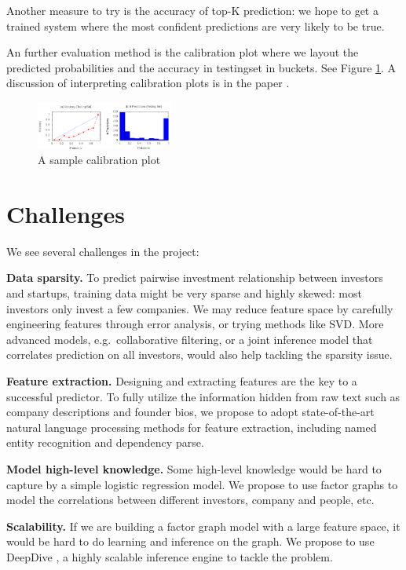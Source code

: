 Another measure to try is the accuracy of top-K prediction: we hope to
get a trained system where the most confident predictions are very
likely to be true.

An further evaluation method is the calibration plot where we layout the
predicted probabilities and the accuracy in testingset in buckets. See
Figure \ref{fig:calibration}. A discussion of interpreting calibration
plots is in the paper \cite{zhang2014feature}.

\begin{figure}[ht!]
\centering
\includegraphics[width=0.4\textwidth]{img/calibration.png}
\caption{A sample calibration plot}
\label{fig:calibration}
\end{figure}

\section{Challenges}\label{challenges}

We see several challenges in the project:

\textbf{Data sparsity.} To predict pairwise investment relationship
between investors and startups, training data might be very sparse and
highly skewed: most investors only invest a few companies. We may reduce
feature space by carefully engineering features through error analysis,
or trying methods like SVD. More advanced models, e.g.~collaborative
filtering, or a joint inference model that correlates prediction on all
investors, would also help tackling the sparsity issue.

\textbf{Feature extraction.} Designing and extracting features are the
key to a successful predictor. To fully utilize the information hidden
from raw text such as company descriptions and founder bios, we propose
to adopt state-of-the-art natural language processing methods for
feature extraction, including named entity recognition and dependency
parse.

\textbf{Model high-level knowledge.} Some high-level knowledge would be
hard to capture by a simple logistic regression model. We propose to use
factor graphs to model the correlations between different investors,
company and people, etc.

\textbf{Scalability.} If we are building a factor graph model with a
large feature space, it would be hard to do learning and inference on
the graph. We propose to use DeepDive \cite{zhang2014feature}, a highly
scalable inference engine to tackle the problem.

